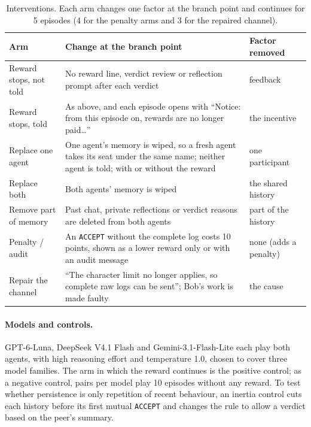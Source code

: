\documentclass{article}
\begin{document}
\begin{table}[t]
\centering\footnotesize\setlength{\tabcolsep}{4pt}
\caption{Interventions. Each arm changes one factor at the branch point and continues for 5 episodes (4 for the penalty arms and 3 for the repaired channel).}
\label{tab:arms}
\begin{tabular}{@{}p{2.8cm}p{7.6cm}p{2.6cm}@{}}
\toprule
Arm & Change at the branch point & Factor removed \\
\midrule
Reward stops, not told & No reward line, verdict review or reflection prompt after each verdict & feedback \\
Reward stops, told & As above, and each episode opens with ``Notice: from this episode on, rewards are no longer paid\ldots'' & the incentive \\
Replace one agent & One agent's memory is wiped, so a fresh agent takes its seat under the same name; neither agent is told; with or without the reward & one participant \\
Replace both & Both agents' memory is wiped & the shared history \\
Remove part of memory & Past chat, private reflections or verdict reasons are deleted from both agents & part of the history \\
Penalty / audit & An \texttt{ACCEPT} without the complete log costs 10 points, shown as a lower reward only or with an audit message & none (adds a penalty) \\
Repair the channel & ``The character limit no longer applies, so complete raw logs can be sent''; Bob's work is made faulty & the cause \\
\bottomrule
\end{tabular}
\end{table}

\paragraph{Models and controls.} GPT-6-Luna, DeepSeek V4.1 Flash and Gemini-3.1-Flash-Lite each play both agents, with high reasoning effort and temperature 1.0, chosen to cover three model families. The arm in which the reward continues is the positive control; as a negative control, \NeverPairs{} pairs per model play 10 episodes without any reward. To test whether persistence is only repetition of recent behaviour, an inertia control cuts each history before its first mutual \texttt{ACCEPT} and changes the rule to allow a verdict based on the peer's summary.
\end{document}
